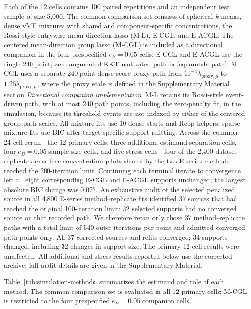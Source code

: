 \documentclass[preprint,12pt,authoryear]{elsarticle}
\begin{document}
Each of the 12 cells contains 100 paired repetitions and an independent test
sample of size 5,000. The common comparison set consists of spherical
$k$-means, dense vMF mixtures with shared and component-specific
concentrations, the Rossi-style entrywise mean-direction lasso (M-L), E-CGL,
and E-ACGL. The centered
mean-direction group lasso (M-CGL) is included as a
directional companion in the four prespecified
$e_B=0.05$ cells. E-CGL and E-ACGL use the single 240-point,
zero-augmented KKT-motivated path in \eqref{eq:lambda-path}. M-CGL uses a separate
240-point dense-score-proxy path from
$10^{-4}\lambda_{\mathrm{proxy},\mu}$ to
$1.25\lambda_{\mathrm{proxy},\mu}$, where the proxy scale is defined in
the Supplementary Material section \emph{Directional companion implementation}.
M-L retains its Rossi-style event-driven path, with
at most 240 path points, including the zero-penalty fit, in the simulation,
because its threshold events are not indexed by either of the centered-group
path scales.
All mixture fits use 10 dense starts and Rcpp helpers; sparse mixture fits use
BIC after target-specific support refitting.
Across the common 24-cell rerun---the 12 primary cells, three additional
estimand-separation cells, four $e_B=0.05$ sample-size cells, and five stress
cells---four of the 2,400 dataset-replicate dense
free-concentration pilots shared by the two E-series methods reached the
200-iteration limit. Continuing each terminal iterate to convergence left all eight
corresponding E-CGL and E-ACGL supports unchanged; the largest absolute BIC
change was 0.027.
An exhaustive audit of the selected penalized source in all 4,800 E-series
method--replicate fits identified 37 sources that had reached the original
100-iteration limit; 32 selected supports had no converged source on that
recorded path. We therefore reran only those 37 method--replicate paths with a
total limit of 540 outer iterations per point and admitted converged path
points only. All 37 corrected
sources and refits converged; 34 supports changed, including 32 changes in
support size. The primary 12-cell results were unaffected. All additional
and stress results reported below use the corrected archive; full audit
details are given in the Supplementary Material.

Table~\ref{tab:simulation-methods} summarizes the estimand and role of each
method. The common comparison set is evaluated in all 12 primary cells;
M-CGL is restricted to the four prespecified $e_B=0.05$ companion cells.
\end{document}
